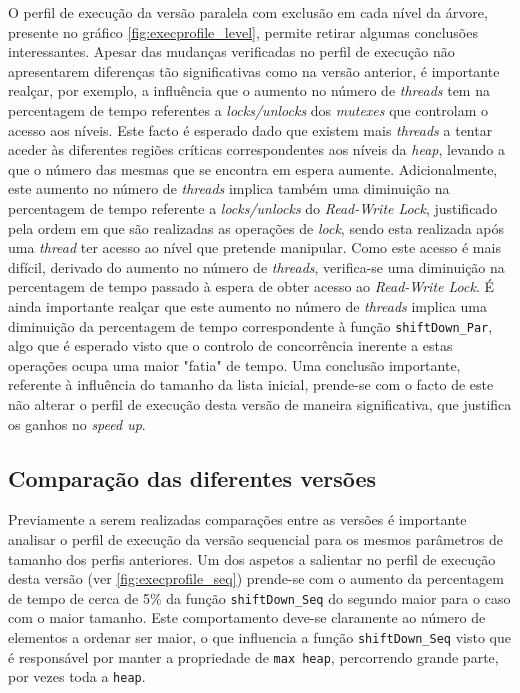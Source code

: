 \documentclass{article}
\begin{document}
O perfil de execução da versão paralela com exclusão em cada nível da árvore, presente no gráfico \ref{fig:execprofile_level}, permite retirar 
algumas conclusões interessantes. Apesar das mudanças verificadas no perfil de execução não apresentarem diferenças tão significativas como 
na versão anterior, é importante realçar, por exemplo, a influência que o aumento no número de \textit{threads} tem na percentagem de tempo
referentes a \textit{locks/unlocks} dos \textit{mutexes} que controlam o acesso aos níveis. Este facto é esperado dado que existem mais \textit{threads}
a tentar aceder às diferentes regiões críticas correspondentes aos níveis da \textit{heap}, levando a que o número das mesmas que se encontra em 
espera aumente.  Adicionalmente, este aumento no número de \textit{threads} implica também uma diminuição na percentagem de tempo referente 
a \textit{locks/unlocks} do \textit{Read-Write Lock}, justificado pela ordem em que são realizadas as operações de \textit{lock}, sendo esta realizada
após uma \textit{thread} ter acesso ao nível que pretende manipular. Como este acesso é mais difícil, derivado do aumento no número de \textit{threads}, 
verifica-se uma diminuição na percentagem de tempo passado à espera de obter acesso ao \textit{Read-Write Lock}. É ainda importante realçar que 
este aumento no número de \textit{threads} implica uma diminuição da percentagem de tempo correspondente à função \texttt{shiftDown\_Par}, algo que é
esperado visto que o controlo de concorrência inerente a estas operações ocupa uma maior "fatia" de tempo.
Uma conclusão importante, referente à influência do tamanho da lista inicial, prende-se com o facto de este não alterar o perfil de execução desta versão
de maneira significativa, que justifica os ganhos no \textit{speed up}.

\subsection{Comparação das diferentes versões}

Previamente a serem realizadas comparações entre as versões é importante analisar o perfil de execução da versão sequencial para os mesmos parâmetros de 
tamanho dos perfis anteriores. Um dos aspetos a salientar no perfil de execução desta versão (ver \ref{fig:execprofile_seq}) prende-se com o aumento da 
percentagem de tempo de cerca de 5\% da função \texttt{shiftDown\_Seq} do segundo maior para o caso com o maior tamanho. Este comportamento deve-se 
claramente ao número de elementos a ordenar ser maior, o que influencia a função \texttt{shiftDown\_Seq} visto que é responsável por manter a propriedade 
de \texttt{max heap}, percorrendo grande parte, por vezes toda a \texttt{heap}.
\end{document}
